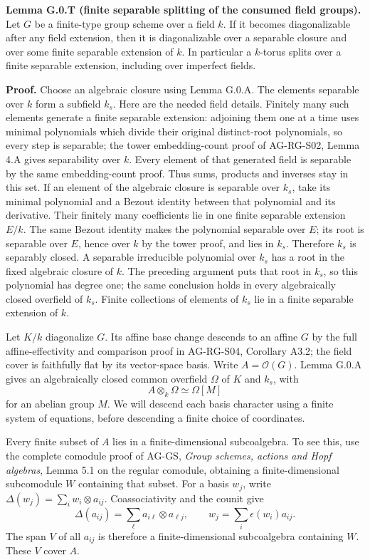\documentclass[11pt,a4paper,openany]{report}
\begin{document}
\label{AG-RG-S08-finite-separable-splitting}

\textbf{Lemma G.0.T (finite separable splitting of the consumed field groups).} Let \(G\) be a finite-type group scheme over a field \(k\). If it becomes diagonalizable after any field extension, then it is diagonalizable over a separable closure and over some finite separable extension of \(k\). In particular a \(k\)-torus splits over a finite separable extension, including over imperfect fields.

\textbf{Proof.} Choose an algebraic closure using Lemma G.0.A. The elements separable over \(k\) form a subfield \(k_s\). Here are the needed field details. Finitely many such elements generate a finite separable extension: adjoining them one at a time uses minimal polynomials which divide their original distinct-root polynomials, so every step is separable; the tower embedding-count proof of AG-RG-S02, Lemma 4.A gives separability over \(k\). Every element of that generated field is separable by the same embedding-count proof. Thus sums, products and inverses stay in this set. If an element of the algebraic closure is separable over \(k_s\), take its minimal polynomial and a Bezout identity between that polynomial and its derivative. Their finitely many coefficients lie in one finite separable extension \(E/k\). The same Bezout identity makes the polynomial separable over \(E\); its root is separable over \(E\), hence over \(k\) by the tower proof, and lies in \(k_s\). Therefore \(k_s\) is separably closed. A separable irreducible polynomial over \(k_s\) has a root in the fixed algebraic closure of \(k\). The preceding argument puts that root in \(k_s\), so this polynomial has degree one; the same conclusion holds in every algebraically closed overfield of \(k_s\). Finite collections of elements of \(k_s\) lie in a finite separable extension of \(k\).

Let \(K/k\) diagonalize \(G\). Its affine base change descends to an affine \(G\) by the full affine-effectivity and comparison proof in AG-RG-S04, Corollary A3.2; the field cover is faithfully flat by its vector-space basis. Write \(A=\mathcal O(G)\). Lemma G.0.A gives an algebraically closed common overfield \(\Omega\) of \(K\) and \(k_s\), with \[
 A\otimes_k\Omega\simeq\Omega[M]
\] for an abelian group \(M\). We will descend each basis character using a finite system of equations, before descending a finite choice of coordinates.

Every finite subset of \(A\) lies in a finite-dimensional subcoalgebra. To see this, use the complete comodule proof of AG-GS, \emph{Group schemes, actions and Hopf algebras}, Lemma 5.1 on the regular comodule, obtaining a finite-dimensional subcomodule \(W\) containing that subset. For a basis \(w_j\), write \(\Delta(w_j)=\sum_i w_i\otimes a_{ij}\). Coassociativity and the counit give \[
 \Delta(a_{ij})=\sum_\ell a_{i\ell}\otimes a_{\ell j},
 \qquad w_j=\sum_i\epsilon(w_i)a_{ij}.
\] The span \(V\) of all \(a_{ij}\) is therefore a finite-dimensional subcoalgebra containing \(W\). These \(V\) cover \(A\).
\end{document}
